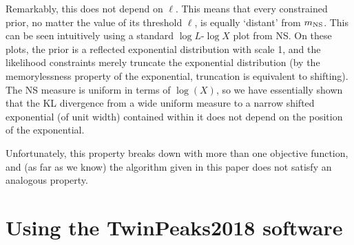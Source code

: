 \documentclass[entropy,article,submit,moreauthors,pdftex,10pt,a4paper]{Definitions/mdpi}
\begin{document}
Remarkably, this does not depend on $\ell$. This means that every constrained
prior, no matter the value of its threshold $\ell$, is equally `distant'
from $m_{\rm NS}$. This can be seen intuitively using a standard
$\log L$-$\log X$ plot from NS. On these plots, the prior is a reflected
exponential distribution with scale 1, and the likelihood constraints
merely truncate the exponential distribution (by the memorylessness property
of the exponential, truncation is equivalent to shifting). The NS measure
is uniform in terms of $\log(X)$, so we have essentially shown that the KL
divergence from a wide uniform measure to a narrow shifted
exponential (of unit width) contained within it does not depend on the
position of the exponential.

Unfortunately, this property breaks down with more than
one objective function, and (as far as we know) the algorithm given in this
paper does not satisfy an analogous property.

\section{Using the TwinPeaks2018 software}\label{sec:software}






%


\end{document}
